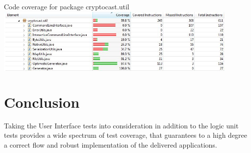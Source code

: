 \documentclass[a4paper,10pt]{scrartcl}
\begin{document}
\begin{illustration}{Code coverage for package cryptocast.util}
\includegraphics[width=450px]{figures/images/util.jpg}
\end{illustration}


\section{Conclusion}
Taking the User Interface tests into consideration in addition to the logic unit tests provides a wide spectrum of test coverage, that guarantees to a high degree a correct flow and robust implementation of the delivered applications.
  
\end{document}

